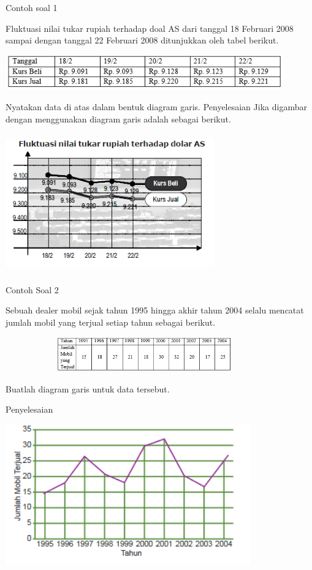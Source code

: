 \documentclass[11pt,fleqn]{book} %
\begin{document}
{Contoh soal 1

Fluktuasi nilai tukar rupiah terhadap doal AS dari tanggal 18 Februari 2008 sampai dengan tanggal 22 Februari 2008 ditunjukkan oleh tabel berikut.

\includegraphics[width = 12cm, height= 1.5cm]{Pictures/Gb1_diana.png}

Nyatakan data di atas dalam bentuk diagram garis.
Penyelesaian
Jika digambar dengan menggunakan diagram garis adalah sebagai berikut.

\includegraphics[width = 9cm, height= 6cm]{Pictures/Gb2_diana.png}


Contoh Soal 2

Sebuah dealer mobil sejak tahun 1995 hingga akhir tahun 2004 selalu mencatat jumlah mobil yang terjual setiap tahun sebagai berikut.

\includegraphics[width = 12cm, height= 1.5cm]{Pictures/Gb3_diana.png}

Buatlah diagram garis untuk data tersebut.

Penyelesaian

\includegraphics[width = 10.6cm, height= 6.1cm]{Pictures/Gb4_diana.png}


}
\end{document}
